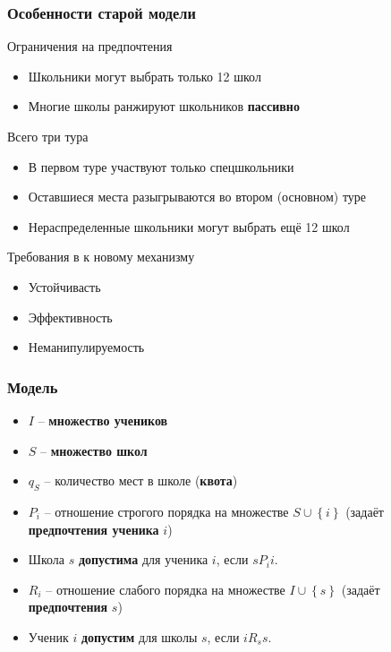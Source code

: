 \documentclass[10pt,pdf,hyperref={unicode}]{beamer}
\begin{document}
\begin{frame}
    \frametitle{Особенности старой модели}
    \begin{block}{Ограничения на предпочтения}
        \begin{itemize}
            \item Школьники могут выбрать только 12 школ
            \item Многие школы ранжируют школьников {\bf пассивно}
        \end{itemize}
    \end{block}

    \begin{block}{Всего три тура}
        \begin{itemize}
            \item В первом туре участвуют только спецшкольники
            \item Оставшиеся места разыгрываются во втором (основном) туре
            \item Нераспределенные школьники могут выбрать ещё 12 школ
        \end{itemize}
    \end{block}

    \begin{block}{Требования в к новому механизму}
        \begin{itemize}
            \item Устойчивасть
            \item Эффективность
            \item Неманипулируемость
        \end{itemize}
    \end{block}
\end{frame}

\begin{frame}
    \frametitle{Модель}
    \begin{itemize}
        \item $I$ -- {\bf множество учеников}
        \item $S$ -- {\bf множество школ}
        \item $q_S$ -- количество мест в школе ({\bf квота})
        \item $P_i$ -- отношение строгого порядка на множестве $S \cup \left\{i\right\}$ (задаёт {\bf предпочтения ученика} $i$)
        \item Школа $s$ {\bf допустима} для ученика $i$, если $s P_i i$.
        \item $R_i$ -- отношение слабого порядка на множестве $I \cup \left\{s\right\}$ (задаёт {\bf предпочтения} $s$)
        \item Ученик $i$ {\bf допустим} для школы $s$, если $i R_s s$.
    \end{itemize}
\end{frame}
\end{document}
